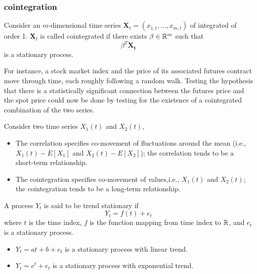 \subsubsection{cointegration}
\begin{definition}[cointegration]
Consider an $m$-dimensional time series $\bm{X}_t = (x_{1,t},...,x_{m,t})$ of integrated of order 1. $\bm{X}_t$ is called cointegrated if there exists $\beta \in \mathbb{R}^m$ such that
$$\beta^T \bm{X_t}$$
is a stationary process.
\end{definition}

\begin{example}
For instance, a stock market index and the price of its associated futures contract move through time, each roughly following a random walk. Testing the hypothesis that there is a statistically significant connection between the futures price and the spot price could now be done by testing for the existence of a cointegrated combination of the two series.
\end{example}

\begin{remark}
Consider two time series $X_1(t)$ and $X_2(t)$, 
\begin{itemize}
\item The correlation specifies co-movement of fluctuations around the mean (i.e., $X_1(t)-E[X_1]$ and $X_2(t)-E[X_2]$); the correlation tends to be a short-term relationship.
\item The cointegration specifies co-movement of values,i.e., $X_1(t)$ and $X_2(t)$; the cointegration tends to be a long-term relationship.
\end{itemize}
\end{remark}



\begin{definition}
A process $Y_t$ is said to be trend stationary if
$$Y_t = f(t) + e_t$$
where $t$ is the time index, $f$ is the function mapping from time index to $\mathbb{R}$, and $e_t$ is a stationary process.
\end{definition}

\begin{example}\hfill
\begin{itemize}
\item $Y_t = at + b +e_t$ is a stationary process with linear trend.
\item $Y_t = e^t + e_t$ is a stationary process with exponential trend.
\end{itemize}
\end{example}

